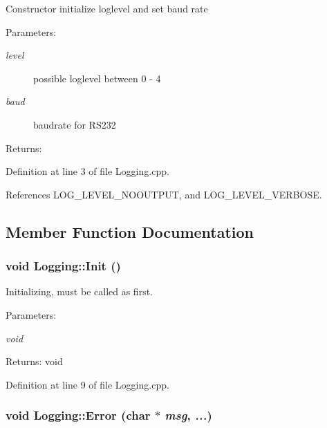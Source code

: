Constructor initialize loglevel and set baud rate \begin{Desc}
\item[Parameters:]
\begin{description}
\item[{\em level}]possible loglevel between 0 - 4 \item[{\em baud}]baudrate for RS232 \end{description}
\end{Desc}
\begin{Desc}
\item[Returns:]\end{Desc}


Definition at line 3 of file Logging.cpp.

References LOG\_\-LEVEL\_\-NOOUTPUT, and LOG\_\-LEVEL\_\-VERBOSE.

\subsection{Member Function Documentation}
\hypertarget{class_logging_1abc9accbd1b01422eb65126f778aa24}{
\subsubsection[Init]{\setlength{\rightskip}{0pt plus 5cm}void Logging::Init ()}}
\label{class_logging_1abc9accbd1b01422eb65126f778aa24}


Initializing, must be called as first. \begin{Desc}
\item[Parameters:]
\begin{description}
\item[{\em void}]\end{description}
\end{Desc}
\begin{Desc}
\item[Returns:]void \end{Desc}


Definition at line 9 of file Logging.cpp.\hypertarget{class_logging_1cf44ab531c72761fba811882336a2ad}{
\subsubsection[Error]{\setlength{\rightskip}{0pt plus 5cm}void Logging::Error (char $\ast$ {\em msg}, \/   {\em ...})}}
\label{class_logging_1cf44ab531c72761fba811882336a2ad}


